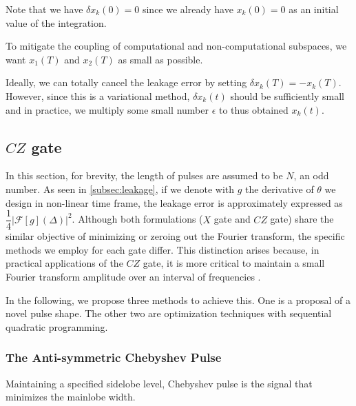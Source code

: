 Note that we have $\delta x_k(0) = 0$ since we already have $x_k(0)=0$ as an initial value of the integration.

To mitigate the coupling of computational and non-computational subspaces,
we want $x_1(T)$ and $x_2(T)$ as small as possible.

Ideally, we can totally cancel the leakage error by setting $\delta x_k (T) = -x_k(T)$.
However, since this is a variational method, $\delta x_k(t)$ should be sufficiently small and
in practice, we multiply some small number $\epsilon$ to thus obtained $x_k(t)$.

\subsection{$CZ$ gate}
In this section, for brevity, the length of pulses are assumed to be $N$, an odd number.
As seen in \ref{subsec:leakage},
if we denote with $g$ the derivative of $\theta$ we design in non-linear time frame,
the leakage error is approximately expressed as $\dfrac{1}{4}|\mathcal{F}[g](\Delta)|^2$.
Although both formulations ($X$ gate and $CZ$ gate) share the similar objective of minimizing or zeroing out the Fourier transform, the specific
methods we employ for each gate differ. This distinction arises because, in practical applications of the $CZ$ gate, it is
more critical to maintain a small Fourier transform amplitude over an interval of frequencies \cite{Martinis2014}.

In the following, we propose three methods to achieve this.
One is a proposal of a novel pulse shape.
The other two are  optimization techniques with sequential quadratic programming.
\subsubsection{The Anti-symmetric Chebyshev Pulse}
Maintaining a specified sidelobe level, Chebyshev pulse is the signal that minimizes the mainlobe width.

